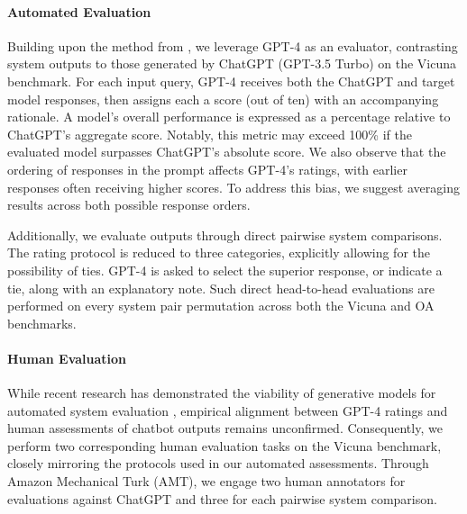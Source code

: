 \paragraph{Automated Evaluation} Building upon the method from \citet{vicuna2023}, we leverage GPT-4 as an evaluator, contrasting system outputs to those generated by ChatGPT (GPT-3.5 Turbo) on the Vicuna benchmark. For each input query, GPT-4 receives both the ChatGPT and target model responses, then assigns each a score (out of ten) with an accompanying rationale. A model’s overall performance is expressed as a percentage relative to ChatGPT’s aggregate score. Notably, this metric may exceed 100\% if the evaluated model surpasses ChatGPT’s absolute score. We also observe that the ordering of responses in the prompt affects GPT-4’s ratings, with earlier responses often receiving higher scores. To address this bias, we suggest averaging results across both possible response orders.

Additionally, we evaluate outputs through direct pairwise system comparisons. The rating protocol is reduced to three categories, explicitly allowing for the possibility of ties. GPT-4 is asked to select the superior response, or indicate a tie, along with an explanatory note. Such direct head-to-head evaluations are performed on every system pair permutation across both the Vicuna and OA benchmarks.

\paragraph{Human Evaluation} While recent research has demonstrated the viability of generative models for automated system evaluation \citep{fu2023gptscore}, empirical alignment between GPT-4 ratings and human assessments of chatbot outputs remains unconfirmed. Consequently, we perform two corresponding human evaluation tasks on the Vicuna benchmark, closely mirroring the protocols used in our automated assessments. Through Amazon Mechanical Turk (AMT), we engage two human annotators for evaluations against ChatGPT and three for each pairwise system comparison.

